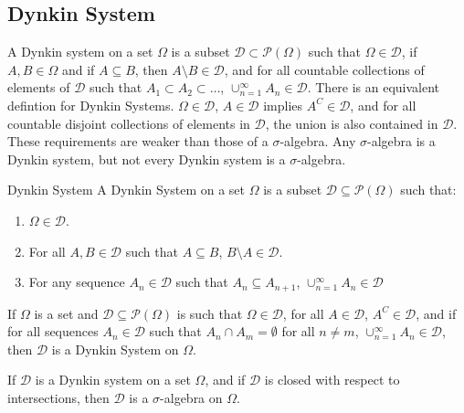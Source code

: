 \subsection{Dynkin System}
    A Dynkin system on a set $\Omega$ is a subset
    $\mathcal{D}\subset\mathcal{P}(\Omega)$ such that
    $\Omega\in\mathcal{D}$, if $A,B\in\Omega$ and if
    $A\subseteq{B}$, then $A\setminus{B}\in\mathcal{D}$,
    and for all countable collections of elements of
    $\mathcal{D}$ such that
    $A_{1}\subset{A}_{2}\subset\hdots$,
    $\cup_{n=1}^{\infty}A_{n}\in\mathcal{D}$. There is
    an equivalent defintion for Dynkin Systems.
    $\Omega\in\mathcal{D}$, $A\in\mathcal{D}$ implies
    $A^{C}\in\mathcal{D}$, and for all countable disjoint
    collections of elements in $\mathcal{D}$, the union
    is also contained in $\mathcal{D}$. These requirements
    are weaker than those of a $\sigma$-algebra. Any
    $\sigma$-algebra is a Dynkin system, but not every
    Dynkin system is a $\sigma$-algebra.
    \begin{ldefinition}{Dynkin System}
        A Dynkin System on a set $\Omega$ is a subset
        $\mathcal{D}\subseteq\mathcal{P}(\Omega)$ such that:
        \begin{enumerate}
            \item $\Omega\in\mathcal{D}$.
            \item For all $A,B\in\mathcal{D}$ such that $A\subseteq{B}$,
                  $B\setminus{A}\in\mathcal{D}$.
            \item For any sequence $A_{n}\in\mathcal{D}$ such that
                  $A_{n}\subseteq{A}_{n+1}$,
                  $\cup_{n=1}^{\infty}A_{n}\in\mathcal{D}$
        \end{enumerate}
    \end{ldefinition}
    \begin{theorem}
        If $\Omega$ is a set and $\mathcal{D}\subseteq\mathcal{P}(\Omega)$
        is such that $\Omega\in\mathcal{D}$, for all $A\in\mathcal{D}$,
        $A^{C}\in\mathcal{D}$, and if for all sequences $A_{n}\in\mathcal{D}$
        such that $A_{n}\cap{A}_{m}=\emptyset$ for all $n\ne{m}$,
        $\cup_{n=1}^{\infty}A_{n}\in\mathcal{D}$, then
        $\mathcal{D}$ is a Dynkin System on $\Omega$.
    \end{theorem}
    \begin{theorem}
        If $\mathcal{D}$ is a Dynkin system on a set
        $\Omega$, and if $\mathcal{D}$ is closed with
        respect to intersections, then $\mathcal{D}$
        is a $\sigma$-algebra on $\Omega$.
    \end{theorem}
